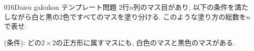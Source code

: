 \begin{prob}{016}{}{Daisu gakukon テンプレート問題}
    2行$n$列のマス目があり, 以下の条件を満たしながら白と黒の2色ですべてのマスを塗り分ける. このような塗り方の総数を$n$で表せ.

    (条件): どの$2\times 2$の正方形に属すマスにも, 白色のマスと黒色のマスがある.

\end{prob}

